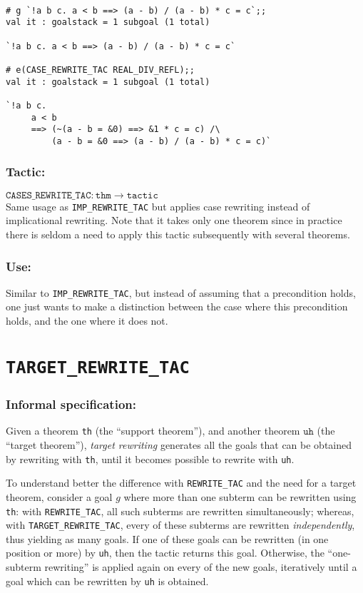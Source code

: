 \documentclass{llncs}
\newcommand*\IMPREWRITETAC{\texttt{IMP\_REWRITE\_TAC}\xspace}
\newcommand*\REWRITETAC{\texttt{REWRITE\_TAC}\xspace}
\newcommand*\TARGETTAC{\texttt{TARGET\_REWRITE\_TAC}\xspace}
\newcommand*\CASETAC{\texttt{CASES\_REWRITE\_TAC}\xspace}
\begin{document}
    \begin{example}
    \begin{verbatim}

# g `!a b c. a < b ==> (a - b) / (a - b) * c = c`;;
val it : goalstack = 1 subgoal (1 total)

`!a b c. a < b ==> (a - b) / (a - b) * c = c`

# e(CASE_REWRITE_TAC REAL_DIV_REFL);;
val it : goalstack = 1 subgoal (1 total)

`!a b c.
     a < b
     ==> (~(a - b = &0) ==> &1 * c = c) /\
         (a - b = &0 ==> (a - b) / (a - b) * c = c)` \end{verbatim}
    \end{example}

		\subsubsection{Tactic:}
		$\mathtt{\CASETAC: thm \to tactic}$\\
    Same usage as \IMPREWRITETAC but applies case rewriting instead of implicational rewriting.
    Note that it takes only one theorem since in practice there is
    seldom a need to apply this tactic subsequently with several theorems.

    \subsubsection{Use:} Similar to \IMPREWRITETAC, but instead of assuming that a precondition holds,
    one just wants to make a distinction between the case where this precondition holds, and the one where it
    does not.

    \newpage
  \section{\TARGETTAC}
		\subsubsection{Informal specification:}
    Given a theorem \texttt{th} (the ``support theorem''),
    and another theorem $\mathtt{uh}$ (the ``target theorem''),
    \emph{target rewriting} generates all the goals that can be obtained by rewriting
    with \texttt{th}, until it becomes possible to rewrite with \texttt{uh}.

    To understand better the difference with \REWRITETAC and the need for a target theorem,
    consider a goal $g$ where more than one subterm can be rewritten using \texttt{th}:
    with \REWRITETAC, all such subterms are rewritten simultaneously; whereas, with \TARGETTAC,
    every of these subterms are rewritten \emph{independently}, thus yielding as many goals.
    If one of these goals can be rewritten (in one position or more) by \texttt{uh}, then
    the tactic returns this goal.
    Otherwise, the ``one-subterm rewriting'' is applied again on every of the new goals,
    iteratively until a goal which can be rewritten by \texttt{uh} is obtained.
\end{document}
